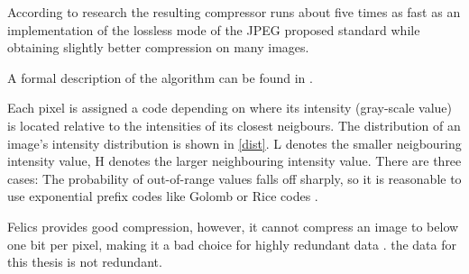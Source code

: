 According to research \cite{felics} the resulting compressor runs about five times as fast as an implementation of the lossless mode of the JPEG proposed standard while obtaining slightly better compression on many images.

A formal description of the algorithm can be found in \cite{felics}.

Each pixel is assigned a code depending on where its intensity (gray-scale value) is located relative to the intensities of its closest neigbours. The distribution of an image's intensity distribution is shown in \ref{dist}. L denotes the smaller neigbouring intensity value, H denotes the larger neighbouring intensity value. There are three cases:
The probability of out-of-range values falls off sharply, so it is reasonable to use exponential prefix codes like Golomb or Rice codes \cite{felics}.


Felics provides good compression, however, it cannot compress an image to below one bit per pixel, making it a bad choice for highly redundant data \cite{handbook}. the data for this thesis is not redundant.